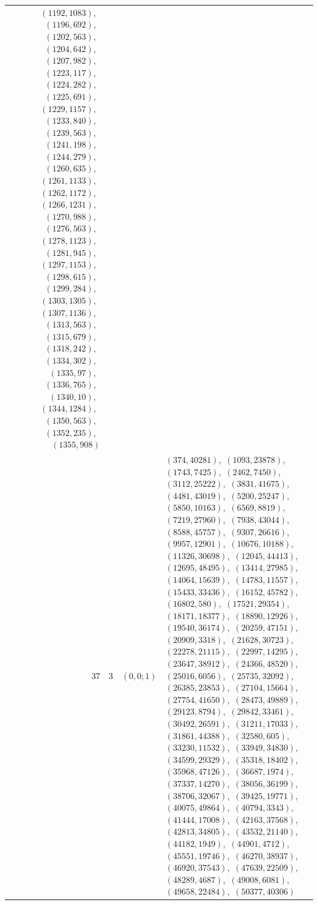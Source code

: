 \documentclass[11pt]{article}
\begin{document}
\begin{longtable}{@{}rrl>{\raggedright\arraybackslash}p{}@{}}
$(1192,1083)$,\allowbreak\ $(1196,692)$,\allowbreak\ $(1202,563)$,\allowbreak\ $(1204,642)$,\allowbreak\ $(1207,982)$,\allowbreak\ $(1223,117)$,\allowbreak\ $(1224,282)$,\allowbreak\ $(1225,691)$,\allowbreak\ $(1229,1157)$,\allowbreak\ $(1233,840)$,\allowbreak\ $(1239,563)$,\allowbreak\ $(1241,198)$,\allowbreak\ $(1244,279)$,\allowbreak\ $(1260,635)$,\allowbreak\ $(1261,1133)$,\allowbreak\ $(1262,1172)$,\allowbreak\ $(1266,1231)$,\allowbreak\ $(1270,988)$,\allowbreak\ $(1276,563)$,\allowbreak\ $(1278,1123)$,\allowbreak\ $(1281,945)$,\allowbreak\ $(1297,1153)$,\allowbreak\ $(1298,615)$,\allowbreak\ $(1299,284)$,\allowbreak\ $(1303,1305)$,\allowbreak\ $(1307,1136)$,\allowbreak\ $(1313,563)$,\allowbreak\ $(1315,679)$,\allowbreak\ $(1318,242)$,\allowbreak\ $(1334,302)$,\allowbreak\ $(1335,97)$,\allowbreak\ $(1336,765)$,\allowbreak\ $(1340,10)$,\allowbreak\ $(1344,1284)$,\allowbreak\ $(1350,563)$,\allowbreak\ $(1352,235)$,\allowbreak\ $(1355,908)$\\
37 & 3 & $(0,0;1)$ & $(374,40281)$,\allowbreak\ $(1093,23878)$,\allowbreak\ $(1743,7425)$,\allowbreak\ $(2462,7450)$,\allowbreak\ $(3112,25222)$,\allowbreak\ $(3831,41675)$,\allowbreak\ $(4481,43019)$,\allowbreak\ $(5200,25247)$,\allowbreak\ $(5850,10163)$,\allowbreak\ $(6569,8819)$,\allowbreak\ $(7219,27960)$,\allowbreak\ $(7938,43044)$,\allowbreak\ $(8588,45757)$,\allowbreak\ $(9307,26616)$,\allowbreak\ $(9957,12901)$,\allowbreak\ $(10676,10188)$,\allowbreak\ $(11326,30698)$,\allowbreak\ $(12045,44413)$,\allowbreak\ $(12695,48495)$,\allowbreak\ $(13414,27985)$,\allowbreak\ $(14064,15639)$,\allowbreak\ $(14783,11557)$,\allowbreak\ $(15433,33436)$,\allowbreak\ $(16152,45782)$,\allowbreak\ $(16802,580)$,\allowbreak\ $(17521,29354)$,\allowbreak\ $(18171,18377)$,\allowbreak\ $(18890,12926)$,\allowbreak\ $(19540,36174)$,\allowbreak\ $(20259,47151)$,\allowbreak\ $(20909,3318)$,\allowbreak\ $(21628,30723)$,\allowbreak\ $(22278,21115)$,\allowbreak\ $(22997,14295)$,\allowbreak\ $(23647,38912)$,\allowbreak\ $(24366,48520)$,\allowbreak\ $(25016,6056)$,\allowbreak\ $(25735,32092)$,\allowbreak\ $(26385,23853)$,\allowbreak\ $(27104,15664)$,\allowbreak\ $(27754,41650)$,\allowbreak\ $(28473,49889)$,\allowbreak\ $(29123,8794)$,\allowbreak\ $(29842,33461)$,\allowbreak\ $(30492,26591)$,\allowbreak\ $(31211,17033)$,\allowbreak\ $(31861,44388)$,\allowbreak\ $(32580,605)$,\allowbreak\ $(33230,11532)$,\allowbreak\ $(33949,34830)$,\allowbreak\ $(34599,29329)$,\allowbreak\ $(35318,18402)$,\allowbreak\ $(35968,47126)$,\allowbreak\ $(36687,1974)$,\allowbreak\ $(37337,14270)$,\allowbreak\ $(38056,36199)$,\allowbreak\ $(38706,32067)$,\allowbreak\ $(39425,19771)$,\allowbreak\ $(40075,49864)$,\allowbreak\ $(40794,3343)$,\allowbreak\ $(41444,17008)$,\allowbreak\ $(42163,37568)$,\allowbreak\ $(42813,34805)$,\allowbreak\ $(43532,21140)$,\allowbreak\ $(44182,1949)$,\allowbreak\ $(44901,4712)$,\allowbreak\ $(45551,19746)$,\allowbreak\ $(46270,38937)$,\allowbreak\ $(46920,37543)$,\allowbreak\ $(47639,22509)$,\allowbreak\ $(48289,4687)$,\allowbreak\ $(49008,6081)$,\allowbreak\ $(49658,22484)$,\allowbreak\ $(50377,40306)$\\

\end{longtable}
\end{document}
